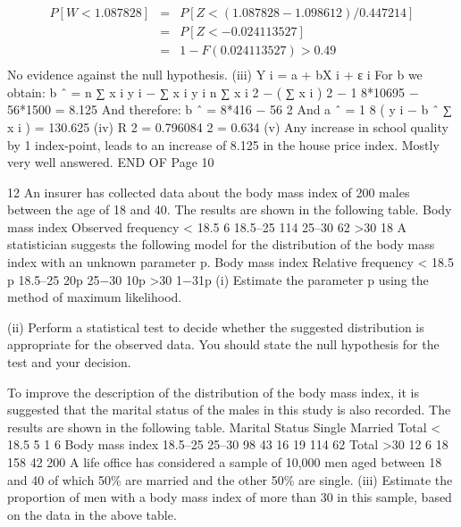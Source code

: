 \documentclass[a4paper,12pt]{article}
\begin{document}
\begin{eqnarray*}
P [ W < 1.087828 ] &=& P [ Z < ( 1.087828 − 1.098612) / 0.447214]\\
&=& P [ Z < − 0.024113527 ] \\ &=& 1 − F (0.024113527) > 0.49\\
\end{eqnarray*}
No evidence against the null hypothesis.
(iii)
Y i = a + bX i + ε i
{
For b we obtain: b ˆ = n ∑ x i y i −
∑ x i \sum y i } { n ∑ x i 2 − ( ∑ x i ) 2 }
− 1
8*10695 − 56*1500
= 8.125
And therefore: b ˆ =
8*416 − 56 2
And a ˆ =
1
8
( \sum y i − b ˆ ∑ x i ) = 130.625
(iv) R 2 = 0.796084 2 = 0.634
(v) Any increase in school quality by 1 index-point, leads to an increase of 8.125
in the house price index.
Mostly very well answered.
END OF %
Page 10

12
An insurer has collected data about the body mass index of 200 males between the
age of 18 and 40. The results are shown in the following table.
Body mass index
Observed frequency
< 18.5
6
18.5–25
114
25–30
62
>30
18
A statistician suggests the following model for the distribution of the body mass index
with an unknown parameter p.
Body mass index
Relative frequency
< 18.5
p
18.5–25
20p
25−30
10p
>30
1−31p
(i) Estimate the parameter p using the method of maximum likelihood.

(ii) Perform a statistical test to decide whether the suggested distribution is appropriate for the observed data. You should state the null hypothesis for the test and your decision.

To improve the description of the distribution of the body mass index, it is suggested that the marital status of the males in this study is also recorded. The results are
shown in the following table.
Marital Status
Single
Married
Total
< 18.5
5
1
6
Body mass index
18.5–25
25–30
98
43
16
19
114
62
Total
>30
12
6
18
158
42
200
A life office has considered a sample of 10,000 men aged between 18 and 40 of which 50\% are married and the other 50\% are single.
(iii) Estimate the proportion of men with a body mass index of more than 30 in this sample, based on the data in the above table.
\end{document}
